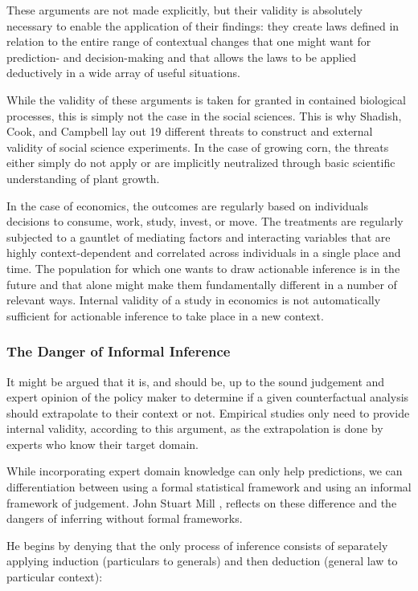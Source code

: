 \documentclass[a4paper,12pt]{article}
\begin{document}
These arguments are not made explicitly, but their validity is absolutely necessary to enable the application of their findings: they create laws defined in relation to the entire range of contextual changes that one might want for prediction- and decision-making and that allows the laws to be applied deductively in a wide array of useful situations.

While the validity of these arguments is taken for granted in contained biological processes, this is simply not the case in the social sciences. This is why Shadish, Cook, and Campbell lay out 19 different threats to construct and external validity of social science experiments. In the case of growing corn, the threats either simply do not apply or are implicitly neutralized through basic scientific understanding of plant growth.

In the case of economics, the outcomes are regularly based on individuals decisions to consume, work, study, invest, or move. The treatments are regularly subjected to a gauntlet of mediating factors and interacting variables that are highly context-dependent and correlated across individuals in a single place and time. The population for which one wants to draw actionable inference is in the future and that alone might make them fundamentally different in a number of relevant ways. Internal validity of a study in economics is not automatically sufficient for actionable inference to take place in a new context.

\subsubsection{The Danger of Informal Inference}

It might be argued that it is, and should be, up to the sound judgement and expert opinion of the policy maker to determine if a given counterfactual analysis should extrapolate to their context or not. Empirical studies only need to provide internal validity, according to this argument, as the extrapolation is done by experts who know their target domain.

While incorporating expert domain knowledge can only help predictions, we can differentiation between using a formal statistical framework and using an informal framework of judgement. John Stuart Mill \parencite*{mill1884}, reflects on these difference and the dangers of inferring without formal frameworks.

He begins by denying that the only process of inference consists of separately applying induction (particulars to generals) and then deduction (general law to particular context):
\end{document}
